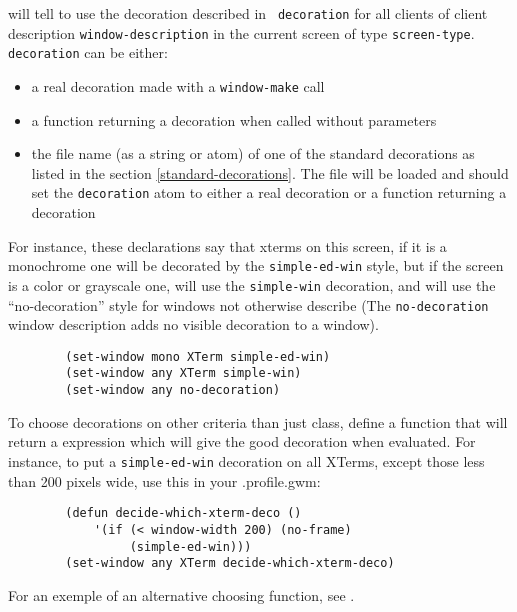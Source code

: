 \begin{description}

\label{set-window} will tell {\GWM} to use the decoration described in {\tt
decoration} for all clients of client description {\tt window-description} in the
current screen of type \verb"screen-type". {\tt decoration} can be either:

\begin{itemize} 
\item a real decoration made with a {\tt window-make} call
\item a function returning a decoration when called without parameters 
\item the file name (as a string or atom) of one of the standard decorations 
as listed in the section \ref{standard-decorations}. The file will be loaded
and should set the {\tt decoration} atom to either a real decoration or a
function returning a decoration 
\end{itemize}

For instance, these declarations say that xterms on this screen, if it is a
monochrome one will be decorated by the \verb"simple-ed-win" style, but if
the screen is a color or grayscale one, will use the \verb"simple-win"
decoration, and will use the ``no-decoration'' style for windows not otherwise
describe (The {\tt no-decoration} window description adds no visible
decoration to a window).

{\exemplefont\begin{verbatim}
        (set-window mono XTerm simple-ed-win)
        (set-window any XTerm simple-win)
        (set-window any no-decoration)
\end{verbatim}}

To choose decorations on other criteria than just class, define a function
that will return a {\WOOL} expression which will give the good decoration when
evaluated. For instance, to put a \verb"simple-ed-win" decoration on all
XTerms, except those less than 200 pixels wide, use this in your .profile.gwm:

{\exemplefont\begin{verbatim}
        (defun decide-which-xterm-deco ()
            '(if (< window-width 200) (no-frame)
                 (simple-ed-win)))
        (set-window any XTerm decide-which-xterm-deco)
\end{verbatim}}

For an exemple of an alternative choosing function, see
.


\end{description}

